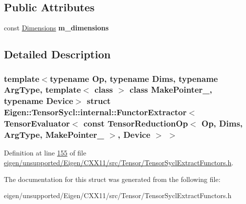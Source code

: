 \subsection*{Public Attributes}
\begin{DoxyCompactItemize}
\item 
\mbox{\label{struct_eigen_1_1_tensor_sycl_1_1internal_1_1_functor_extractor_3_01_tensor_evaluator_3_01const_08e46bb7792b8f07bb791a4ece83b9c3b_af45d751ba2a845d695661bc0d9116210}} 
const \hyperlink{class_eigen_1_1internal_1_1_tensor_lazy_evaluator_writable}{Dimensions} {\bfseries m\+\_\+dimensions}
\end{DoxyCompactItemize}


\subsection{Detailed Description}
\subsubsection*{template$<$typename Op, typename Dims, typename Arg\+Type, template$<$ class $>$ class Make\+Pointer\+\_\+, typename Device$>$\newline
struct Eigen\+::\+Tensor\+Sycl\+::internal\+::\+Functor\+Extractor$<$ Tensor\+Evaluator$<$ const Tensor\+Reduction\+Op$<$ Op, Dims, Arg\+Type, Make\+Pointer\+\_\+ $>$, Device $>$ $>$}



Definition at line \hyperlink{eigen_2unsupported_2_eigen_2_c_x_x11_2src_2_tensor_2_tensor_sycl_extract_functors_8h_source_l00155}{155} of file \hyperlink{eigen_2unsupported_2_eigen_2_c_x_x11_2src_2_tensor_2_tensor_sycl_extract_functors_8h_source}{eigen/unsupported/\+Eigen/\+C\+X\+X11/src/\+Tensor/\+Tensor\+Sycl\+Extract\+Functors.\+h}.



The documentation for this struct was generated from the following file\+:\begin{DoxyCompactItemize}
\item 
eigen/unsupported/\+Eigen/\+C\+X\+X11/src/\+Tensor/\+Tensor\+Sycl\+Extract\+Functors.\+h\end{DoxyCompactItemize}
